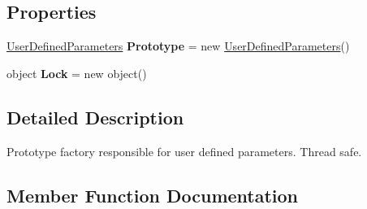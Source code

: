 \subsection*{Properties}
\begin{DoxyCompactItemize}
\item 
\mbox{\label{class_chess_tracking_1_1_image_processing_1_1_pipeline_data_1_1_user_defined_parameters_prototype_factory_ac6f0b8537b80c381beda26e296116bbd}} 
\mbox{\hyperlink{class_chess_tracking_1_1_image_processing_1_1_pipeline_data_1_1_user_defined_parameters}{User\+Defined\+Parameters}} {\bfseries Prototype} = new \mbox{\hyperlink{class_chess_tracking_1_1_image_processing_1_1_pipeline_data_1_1_user_defined_parameters}{User\+Defined\+Parameters}}()
\item 
\mbox{\label{class_chess_tracking_1_1_image_processing_1_1_pipeline_data_1_1_user_defined_parameters_prototype_factory_a9b52deb3ad2aef38bc8c56236acfadd5}} 
object {\bfseries Lock} = new object()
\end{DoxyCompactItemize}


\subsection{Detailed Description}
Prototype factory responsible for user defined parameters. Thread safe. 



\subsection{Member Function Documentation}
\mbox{\label{class_chess_tracking_1_1_image_processing_1_1_pipeline_data_1_1_user_defined_parameters_prototype_factory_a1069fa2869311752f46057cf5c2dca6b}} 
